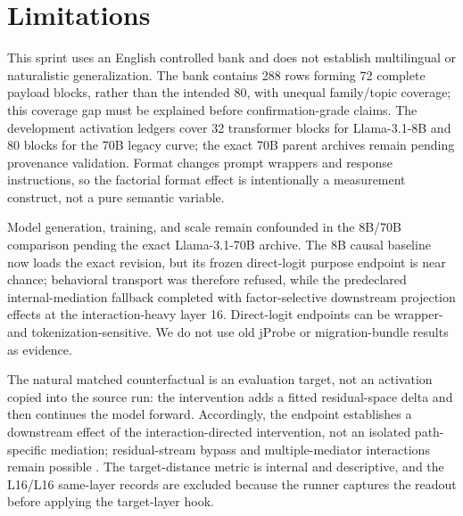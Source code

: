 \section{Limitations}
This sprint uses an English controlled bank and does not establish multilingual or naturalistic generalization. The bank contains 288 rows forming 72 complete payload blocks, rather than the intended 80, with unequal family/topic coverage; this coverage gap must be explained before confirmation-grade claims. The development activation ledgers cover 32 transformer blocks for Llama-3.1-8B and 80 blocks for the 70B legacy curve; the exact 70B parent archives remain pending provenance validation. Format changes prompt wrappers and response instructions, so the factorial format effect is intentionally a measurement construct, not a pure semantic variable.

Model generation, training, and scale remain confounded in the 8B/70B comparison pending the exact Llama-3.1-70B archive. The 8B causal baseline now loads the exact revision, but its frozen direct-logit purpose endpoint is near chance; behavioral transport was therefore refused, while the predeclared internal-mediation fallback completed with factor-selective downstream projection effects at the interaction-heavy layer 16. Direct-logit endpoints can be wrapper- and tokenization-sensitive. We do not use old jProbe or migration-bundle results as evidence.

The natural matched counterfactual is an evaluation target, not an activation copied into the source run: the intervention adds a fitted residual-space delta and then continues the model forward. Accordingly, the endpoint establishes a downstream effect of the interaction-directed intervention, not an isolated path-specific mediation; residual-stream bypass and multiple-mediator interactions remain possible \citep{vaidyanathan2026mediators}. The target-distance metric is internal and descriptive, and the L16/L16 same-layer records are excluded because the runner captures the readout before applying the target-layer hook.
